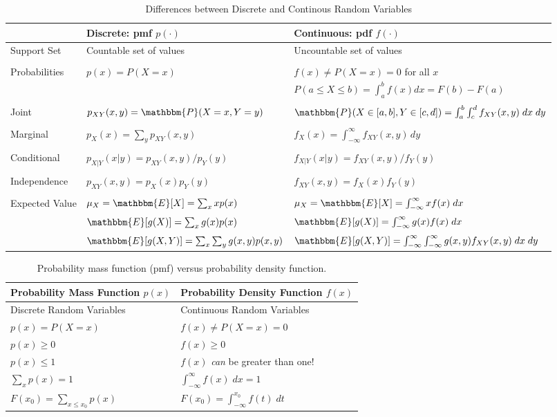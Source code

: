 \documentclass[12pt]{article}
\begin{document}
\pagestyle{empty}


\begin{table}
\onehalfspacing
\centering
	\begin{tabular}{l|ll}
	\hline
  & Discrete: pmf $p(\cdot)$ & Continuous: pdf $f(\cdot)$ \\
	\hline
	Support Set & Countable set of values & Uncountable set of values\\\\
  Probabilities & $p(x) = P(X=x)$ &$f(x) \neq P(X=x)= 0$ for all $x$\\
	&&$P(a\leq X \leq b) = \int_{a}^{b} f(x)dx=F(b) - F(a)$\\\\
  Joint & $p_{XY}(x,y) = \mathbbm{P}(X=x,Y=y)$& $\mathbbm{P}(X\in [a,b],  Y\in [c,d]) = \int_{a}^b \int_{c}^d f_{XY}(x,y)\; dx \; dy$\\ \\
  Marginal & $p_X(x) = \sum_{y} p_{XY}(x,y)$ & $f_X(x) = \int_{-\infty}^{\infty} f_{XY}(x,y) \, dy$\\ \\
  Conditional  & $p_{X|Y}(x|y) = p_{XY}(x,y)/p_Y(y) $ & $f_{X|Y}(x|y) = f_{XY}(x,y)/f_Y(y)$ \\ \\
	 Independence & $p_{XY}(x,y) = p_X(x)p_Y(y)$ & $f_{XY}(x,y) = f_X(x) f_Y(y)$\\\\
	Expected Value & $\mu_X=\mathbbm{E}[X] =\sum_x xp(x)$ &$\mu_X=\mathbbm{E}[X] =\int_{-\infty}^{\infty} xf(x)\; dx$\\
	& $\mathbbm{E}[g(X)] =\sum_x g(x)p(x)$ &$\mathbbm{E}[g(X)] =\int_{-\infty}^{\infty} g(x)f(x)\; dx$\\
  & $\mathbbm{E}[g(X,Y)] =\sum_x \sum_y g(x,y)p(x,y)$ &$\mathbbm{E}[g(X,Y)] =\int_{-\infty}^{\infty}\int_{-\infty}^{\infty} g(x,y)f_{XY}(x,y)\; dx \; dy$\\
	\hline
	\end{tabular}
	\caption{Differences between Discrete and Continous Random Variables}
	
\end{table}




\begin{table}
\onehalfspacing
\centering
\begin{tabular}{l|l}
\hline
Probability Mass Function $p(x)$& Probability Density Function $f(x)$\\
	\hline
	Discrete Random Variables & Continuous Random Variables\\
	$p(x) = P(X=x)$& $f(x) \neq P(X=x)=0$\\
	$p(x)\geq 0$ & $f(x)\geq 0$\\
	$p(x) \leq 1$ & $f(x)$ \emph{can} be greater than one!\\
	$\sum_{x}p(x) = 1$&$\int_{-\infty}^{\infty}f(x)\; dx = 1$\\
	$F(x_0)= \sum_{x\leq x_0} p(x)$& $F(x_0) = \int_{-\infty}^{x_0} f(t)\; dt$\\
	\hline
\end{tabular}
\caption{Probability mass function (pmf) versus probability density function.}
\end{table}
\end{document}

